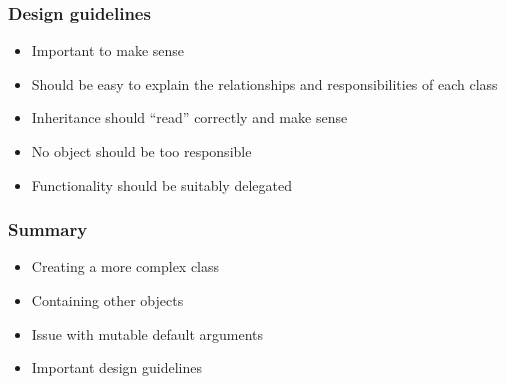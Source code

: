 \documentclass[14pt,compress,aspectratio=169]{beamer}
\begin{document}
\begin{frame}
  \frametitle{Design guidelines}
  \begin{itemize}
  \item Important to make sense
  \item Should be easy to explain the relationships and responsibilities of
    each class
  \item Inheritance should ``read'' correctly and make sense
  \item No object should be too responsible
  \item Functionality should be suitably delegated
  \end{itemize}
\end{frame}

\begin{frame}
  \frametitle{Summary}
  \begin{itemize}
  \item Creating a more complex class
  \item Containing other objects
  \item Issue with mutable default arguments
  \item Important design guidelines
  \end{itemize}
\end{frame}
\end{document}

